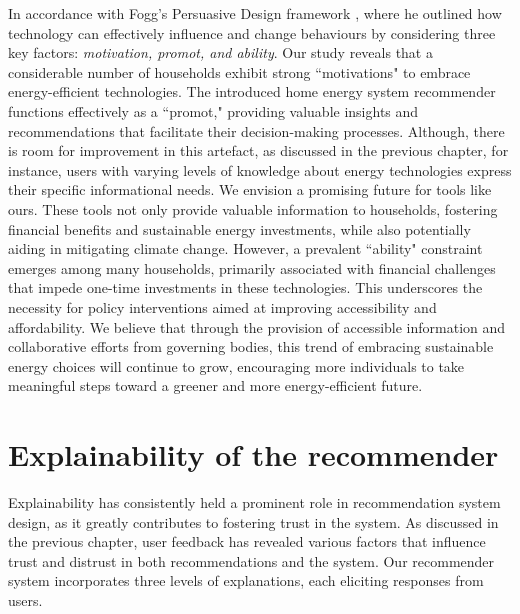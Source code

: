 In accordance with Fogg's Persuasive Design framework \cite{Fogg2009}, 
where he outlined how technology can effectively influence and change behaviours by considering three key factors: 
\emph{motivation, promot, and ability}. 
Our study reveals that a considerable number of households exhibit strong ``motivations" to embrace energy-efficient technologies. 
The introduced home energy system recommender functions effectively as a ``promot," providing valuable insights and recommendations that facilitate their decision-making processes. 
Although, there is room for improvement in this artefact, as discussed in the previous chapter,
for instance, users with varying levels of knowledge about energy technologies express their specific informational needs.
We envision a promising future for tools like ours.
These tools not only provide valuable information to households, fostering financial benefits and sustainable energy investments, while also potentially aiding in mitigating climate change. 
However, a prevalent ``ability" constraint emerges among many households,
primarily associated with financial challenges that impede one-time investments in these technologies. 
This underscores the necessity for policy interventions aimed at improving accessibility and affordability. 
We believe that through the provision of accessible information and collaborative efforts from governing bodies, this trend of embracing sustainable energy choices will continue to grow, encouraging more individuals to take meaningful steps toward a greener and more energy-efficient future.  


\section*{Explainability of the recommender}

Explainability has consistently held a prominent role in recommendation system design, as it greatly contributes to fostering trust in the system. 
As discussed in the previous chapter, user feedback has revealed various factors that influence trust and distrust in both recommendations and the system. 
Our recommender system incorporates three levels of explanations, each eliciting responses from users. 

